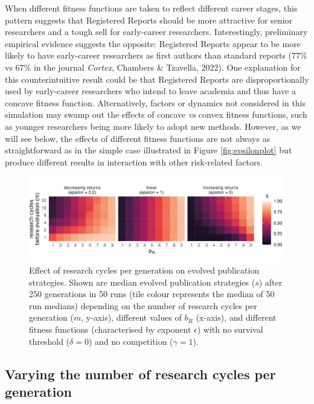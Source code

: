 \documentclass[
  ,man,mask,floatsintext]{apa6}
\begin{document}
When different fitness functions are taken to reflect different career stages,
this pattern suggests that Registered Reports should be more attractive for senior researchers and a tough sell for early-career researchers.
Interestingly, preliminary empirical evidence suggests the opposite:
Registered Reports appear to be more likely to have early-career researchers as first authors than standard reports (77\% vs 67\% in the journal \emph{Cortex}, Chambers \& Tzavella, 2022).
One explanation for this counterintuitive result could be that Registered Reports are disproportionally used by early-career researchers who intend to leave academia and thus have a concave fitness function.
Alternatively, factors or dynamics not considered in this simulation may swamp out the effects of concave \emph{vs} convex fitness functions, such as younger researchers being more likely to adopt new methods.
However, as we will see below, the effects of different fitness functions are not always as straightforward as in the simple case illustrated in Figure \ref{fig:epsilonplot} but produce different results in interaction with other risk-related factors.



\begin{figure}

{\centering \includegraphics[width=1\linewidth]{plots/plot_m_tile_evo} 

}

\caption{Effect of research cycles per generation on evolved publication strategies. Shown are median evolved publication strategies (\(s\)) after 250 generations in 50 runs (tile colour represents the median of 50 run medians) depending on the number of research cycles per generation (\(m\), y-axis), different values of \(b_{R}\) (x-axis), and different fitness functions (characterised by exponent \(\epsilon\)) with no survival threshold (\(\delta = 0\)) and no competition (\(\gamma = 1\)).}\label{fig:mplot}
\end{figure}

\hypertarget{varying-the-number-of-research-cycles-per-generation}{%
\subsection{Varying the number of research cycles per generation}\label{varying-the-number-of-research-cycles-per-generation}}
\end{document}
